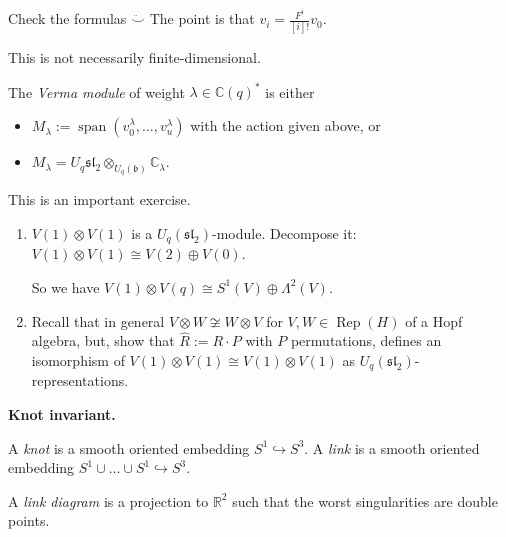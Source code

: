 \begin{exercise}
\label{exercise-l3-check}
Check the formulas $\ddot\smile$ The point
is that $v_{i}=\frac{F^{i}}{[i]!}v_{0}$.
\end{exercise}

\begin{remark}
\label{remark-l3-infinite}
This is not necessarily
finite-dimensional.
\end{remark}

\begin{definition}
\label{definition-l3-verma-module}
The {\it Verma module} of weight
$\lambda \in \mathbb{C}(q)^{*}$ is either
\begin{itemize}
\item $M_{\lambda}:=\operatorname{span}
(v_{0}^{\lambda},\ldots,v_{u}^{\lambda})$
with the action given above, or
\item $M_{\lambda}=U_{q}\mathfrak{sl}_{2}
\otimes_{U_{q}(\mathfrak{b})}
\mathbb{C}_{\lambda}$.
\end{itemize}
\end{definition}

\begin{exercise}
\label{exercise-l3-important}
This is an important exercise.
\begin{enumerate}
\item $V(1)\otimes V(1)$ is a
$U_{q}(\mathfrak{sl}_{2})$-module.
Decompose it:
$V(1)\otimes V(1)\cong
V(2)\oplus V(0)$.

So we have $V(1)\otimes V(q)\cong
S^{1}(V)\oplus \Lambda^{2}(V)$.

\item Recall that in general
$V\otimes W\not\cong W\otimes V$ for
$V,W \in \operatorname{Rep}(H)$ of a Hopf
algebra, but, show that
$\hat{R}:=R\cdot P$ with $P$ permutations,
defines an isomorphism of
$V(1)\otimes V(1)\cong V(1)\otimes V(1)$
as
$U_{q}(\mathfrak{sl}_{2})$-representations.
\end{enumerate}
\end{exercise}

\medskip\noindent
{\bf Knot invariant.}

\begin{definition}
\label{definition-l3-knot}
A {\it knot} is a smooth oriented
embedding $S^{1}\hookrightarrow S^{3}$.
A {\it link} is a smooth oriented
embedding
$S^{1}\cup \ldots\cup S^{1}
\hookrightarrow S^{3}$.

A {\it link diagram} is a projection to
$\mathbb{R}^{2}$ such that the worst
singularities are double points.
\end{definition}

